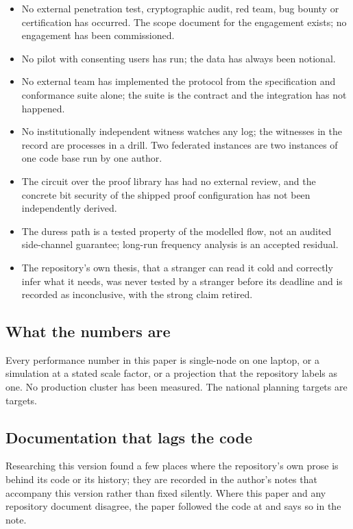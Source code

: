 \begin{itemize}
  \item No external penetration test, cryptographic audit, red team, bug bounty or certification
    has occurred. The scope document for the engagement exists; no engagement has been commissioned.
  \item No pilot with consenting users has run; the data has always been notional.
  \item No external team has implemented the protocol from the specification and conformance suite
    alone; the suite is the contract and the integration has not happened.
  \item No institutionally independent witness watches any log; the witnesses in the record are
    processes in a drill. Two federated instances are two instances of one code base run by one
    author.
  \item The circuit over the proof library has had no external review, and the concrete bit
    security of the shipped proof configuration has not been independently derived.
  \item The duress path is a tested property of the modelled flow, not an audited side-channel
    guarantee; long-run frequency analysis is an accepted residual.
  \item The repository's own thesis, that a stranger can read it cold and correctly infer what it
    needs, was never tested by a stranger before its deadline and is recorded as inconclusive, with
    the strong claim retired.
\end{itemize}

\subsection{What the numbers are}

Every performance number in this paper is single-node on one laptop, or a simulation at a stated
scale factor, or a projection that the repository labels as one. No production cluster has been
measured. The national planning targets are targets.

\subsection{Documentation that lags the code}

Researching this version found a few places where the repository's own prose is behind its code
or its history; they are recorded in the author's notes that accompany this version rather than
fixed silently. Where this paper and any repository document disagree, the paper followed the code
at  and says so in the note.
